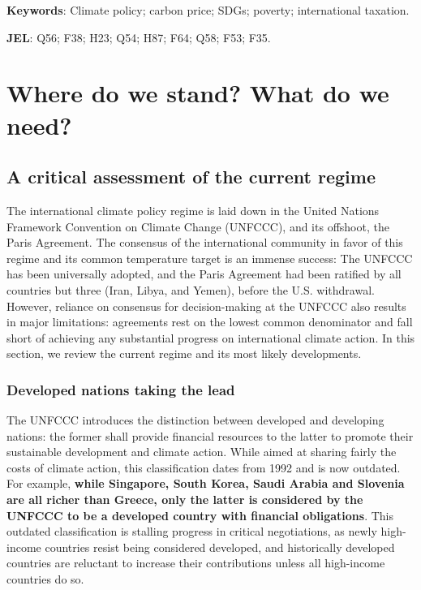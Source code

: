\documentclass[12pt,english]{article}
\makeatletter
\renewcommand\tableofcontents{%
    \@starttoc{toc}%
}
\makeatother
\begin{document}
\textbf{Keywords}: Climate policy; carbon price; SDGs; poverty; international taxation.

\textbf{JEL}: Q56; F38; H23; Q54; H87; F64; Q58; F53; F35.

\clearpage
\tableofcontents


\clearpage


\section{Where do we stand? What do we need?\label{sec:now}}%


\subsection{A critical assessment of the current regime\label{subsec:criticism}}

The international climate policy regime is laid down in the United Nations Framework Convention on Climate Change (UNFCCC), and its offshoot, the Paris Agreement. The consensus of the international community in favor of this regime and its common  temperature target is an immense success: The UNFCCC has been universally adopted, and the Paris Agreement had been ratified by all countries but three (Iran, Libya, and Yemen), before the U.S. withdrawal. However, reliance on consensus for decision-making at the UNFCCC also results 
in major limitations: agreements rest on the lowest common denominator and fall short of achieving any substantial progress on international climate action. In this section, we review the current regime and its most likely developments.

\subsubsection{Developed nations taking the lead\label{subsubsec:developed}}
The UNFCCC introduces the distinction between developed and developing nations: the former shall provide financial resources to the latter to promote their sustainable development and climate action. While aimed at sharing fairly the costs of climate action, this classification dates from 1992 and is now outdated. For example, \textbf{while Singapore, South Korea, Saudi Arabia and Slovenia are all richer than Greece, only the latter is considered by the UNFCCC to be a developed country with financial obligations}. This outdated classification is stalling progress in critical negotiations, as newly high-income countries resist being considered developed, and historically developed countries are reluctant to increase their contributions unless all high-income countries do so.
\end{document}
